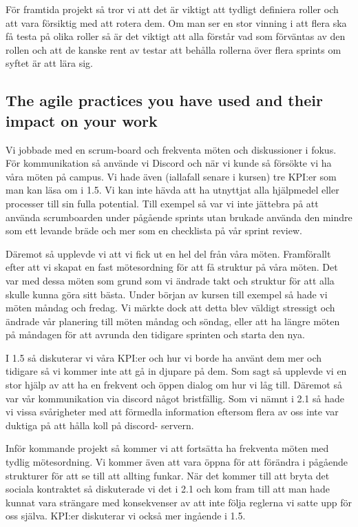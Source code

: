 \documentclass{scrartcl}
\begin{document}
För framtida projekt så tror vi att det är viktigt att tydligt definiera roller och att vara försiktig med att rotera dem. Om man ser en stor vinning i att flera ska få testa på olika roller så är det viktigt att alla förstår vad som förväntas av den rollen och att de kanske rent av testar att behålla rollerna över flera sprints om syftet är att lära sig. 



\subsection{The agile practices you have used and their impact on your work}
Vi jobbade med en scrum-board och frekventa möten och diskussioner i fokus. För kommunikation så använde vi Discord och när vi kunde så försökte vi ha våra möten på campus. Vi hade även (iallafall senare i kursen) tre KPI:er som man kan läsa om i 1.5. Vi kan inte hävda att ha utnyttjat alla hjälpmedel eller processer till sin fulla potential. Till exempel så var vi inte jättebra på att använda scrumboarden under pågående sprints utan brukade använda den mindre som ett levande bräde och mer som en checklista på vår sprint review. 

Däremot så upplevde vi att vi fick ut en hel del från våra möten. Framförallt efter att vi skapat en fast mötesordning för att få struktur på våra möten. Det var med dessa möten som grund som vi ändrade takt och struktur för att alla skulle kunna göra sitt bästa. Under början av kursen till exempel så  hade vi möten måndag och fredag. Vi märkte dock att detta blev väldigt stressigt och ändrade vår planering till möten måndag och söndag, eller att ha längre möten på måndagen för att avrunda den tidigare sprinten och starta den nya. 

I 1.5 så diskuterar vi våra KPI:er och hur vi borde ha använt dem mer och tidigare så vi kommer inte att gå in djupare på dem. Som sagt så upplevde vi en stor hjälp av att ha en frekvent och öppen dialog om hur vi låg till. Däremot så var vår kommunikation via discord något bristfällig. Som vi nämnt i 2.1 så hade vi vissa svårigheter med att förmedla information eftersom flera av oss inte var duktiga på att hålla koll på discord- servern. 

Inför kommande projekt så kommer vi att fortsätta ha frekventa möten med tydlig mötesordning. Vi kommer även att vara öppna för att förändra i pågående strukturer för att se till att allting funkar. När det kommer till att bryta det sociala kontraktet så diskuterade vi det i 2.1 och kom fram till att man hade kunnat vara strängare med konsekvenser av att inte följa reglerna vi satte upp för oss själva. KPI:er diskuterar vi också mer ingående i 1.5.
\end{document}
